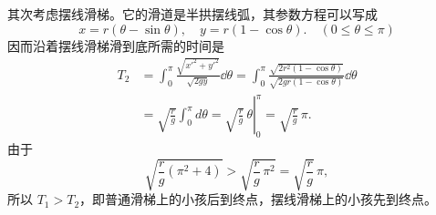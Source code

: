 其次考虑摆线滑梯。它的滑道是半拱摆线弧，其参数方程可以写成
\[
  x = r(\theta - \sin\theta),\quad y = r(1 - \cos\theta).\quad (0 \leqslant \theta \leqslant \pi)
\]
因而沿着摆线滑梯滑到底所需的时间是
\begin{align*}
  T_2 &= \int_{0}^{\pi} \frac{\sqrt{x'^2 + y'^2}}{\sqrt{2gy}}\dd\theta
       = \int_{0}^{\pi} \frac{\sqrt{2r^2(1 - \cos\theta)}}{\sqrt{2gr(1 - \cos\theta)}}\dd\theta \\
      &= \sqrt{\frac{r}{g}} \int_{0}^{\pi} d\theta
       = \left.\sqrt{\frac{r}{g}}\,\theta\right|_{0}^{\pi}
       = \sqrt{\frac{r}{g}}\,\pi.
\end{align*}
由于
\[
  \sqrt{\frac{r}{g}(\pi^2 + 4)} > \sqrt{\frac{r}{g}\,\pi^2} = \sqrt{\frac{r}{g}}\,\pi,
\]
所以 $T_1 > T_2$，即普通滑梯上的小孩后到终点，摆线滑梯上的小孩先到终点。

